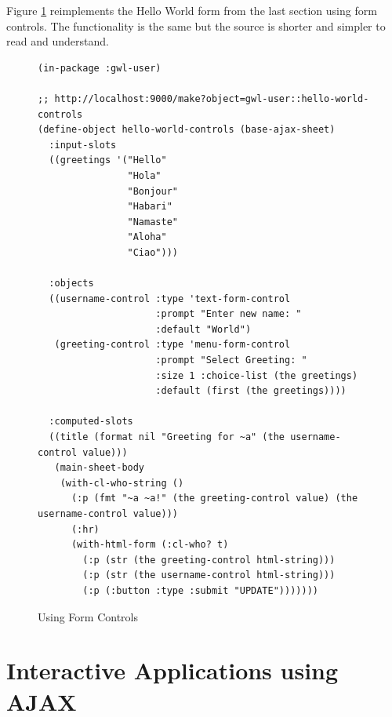 \documentclass [11pt]{book}
\begin{document}
Figure 
\ref{fig:gwl-hello-world-controls} reimplements the Hello World form from the last section
using form controls.  The functionality is the same but the source is shorter and simpler to read and understand.
\begin{figure}
\begin{lrbox}{\boxedverb}
\begin{minipage}{\linewidth}
{\small

\begin{verbatim}(in-package :gwl-user)

;; http://localhost:9000/make?object=gwl-user::hello-world-controls
(define-object hello-world-controls (base-ajax-sheet)
  :input-slots
  ((greetings '("Hello"
                "Hola"
                "Bonjour"
                "Habari"
                "Namaste"
                "Aloha"
                "Ciao")))

  :objects
  ((username-control :type 'text-form-control
                     :prompt "Enter new name: "
                     :default "World")
   (greeting-control :type 'menu-form-control
                     :prompt "Select Greeting: "
                     :size 1 :choice-list (the greetings)
                     :default (first (the greetings))))

  :computed-slots
  ((title (format nil "Greeting for ~a" (the username-control value)))
   (main-sheet-body
    (with-cl-who-string ()
      (:p (fmt "~a ~a!" (the greeting-control value) (the username-control value)))
      (:hr)
      (with-html-form (:cl-who? t)
        (:p (str (the greeting-control html-string)))
        (:p (str (the username-control html-string)))
        (:p (:button :type :submit "UPDATE")))))))

\end{verbatim}}
\end{minipage}
\end{lrbox}
\fbox{\usebox{\boxedverb}}

\caption{Using Form Controls}

\label{fig:gwl-hello-world-controls}

\end{figure}




\section{Interactive Applications using AJAX}

\label{sec:interactiveapplicationsusingajax}
\end{document}
